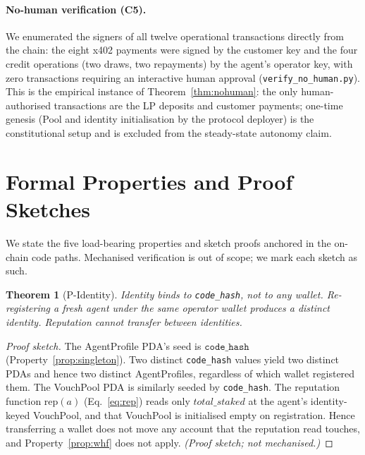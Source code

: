 \documentclass[10pt,conference,letterpaper]{IEEEtran}
\newtheorem{theorem}{Theorem}
\theoremstyle{definition}
\newcommand{\codehash}{\texttt{code\_hash}}
\begin{document}
\paragraph{No-human verification (C5).} We enumerated the signers of all
twelve operational transactions directly from the chain: the eight x402
payments were signed by the customer key and the four credit operations
(two draws, two repayments) by the agent's operator key, with zero
transactions requiring an interactive human approval
(\texttt{verify\_no\_human.py}). This is the empirical instance of
Theorem~\ref{thm:nohuman}: the only human-authorised transactions are the
LP deposits and customer payments; one-time genesis (Pool and identity
initialisation by the protocol deployer) is the constitutional setup and is
excluded from the steady-state autonomy claim.

\section{Formal Properties and Proof Sketches}\label{sec:formal}

We state the five load-bearing properties and sketch proofs anchored in
the on-chain code paths. Mechanised verification is out of scope; we
mark each sketch as such.

\begin{theorem}[P-Identity]\label{thm:identity}
Identity binds to \codehash, not to any wallet. Re-registering a fresh
agent under the same operator wallet produces a distinct identity.
Reputation cannot transfer between identities.
\end{theorem}

\begin{proof}[Proof sketch]
The AgentProfile PDA's seed is $\codehash$
(Property~\ref{prop:singleton}). Two distinct \codehash{} values yield
two distinct PDAs and hence two distinct AgentProfiles, regardless of
which wallet registered them. The VouchPool PDA is similarly seeded by
\codehash. The reputation function $\mathrm{rep}(a)$ (Eq.~\ref{eq:rep})
reads only $\mathit{total\_staked}$ at the agent's identity-keyed
VouchPool, and that VouchPool is initialised empty on registration.
Hence transferring a wallet does not move any account that the
reputation read touches, and Property~\ref{prop:whf} does not apply.
\emph{(Proof sketch; not mechanised.)}
\end{proof}
\end{document}
